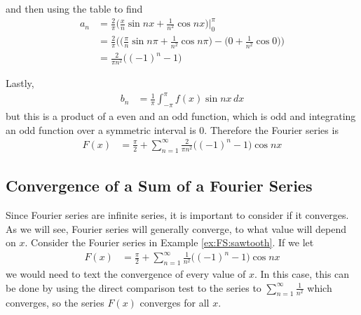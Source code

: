 \begin{example}
\begin{center}
\end{center}
and then using the table to find
%
\begin{align*}
a_n & =\frac{2}{\pi} \biggl( \frac{x}{n} \sin nx + \frac{1}{n^2} \cos nx \biggr) \biggr \vert_0^{\pi} \\
& = \frac{2}{\pi}\biggl(\biggl(\frac{\pi}{n} \sin n \pi + \frac{1}{n^2} \cos n\pi \biggr) - 
\biggl( 0 +\frac{1}{n^2} \cos 0 \biggr) \biggr)\\
& = \frac{2}{\pi n^2} \bigl( (-1)^n - 1) 
\end{align*}

Lastly, 
%
\begin{align*}
b_n & = \frac{1}{\pi} \int_{-\pi}^{\pi} f(x) \sin nx \, dx 
\end{align*}
but this is a product of a even and an odd function, which is odd and integrating an odd function over a symmetric interval is 0.  Therefore the Fourier series is
%
\begin{align*}
F(x) & = \frac{\pi}{2} + \sum_{n=1}^{\infty} \frac{2}{\pi n^2} \bigl( (-1)^n - 1) \cos nx 
\end{align*}

\end{example}


\subsection{Convergence of a Sum of a Fourier Series} 

Since Fourier series are infinite series, it is important to consider if it converges.  As we will see, Fourier series will generally converge, to what value will depend on $x$.   Consider the Fourier series in Example \ref{ex:FS:sawtooth}.  If we let
%
\begin{align*}
F(x) & = \frac{\pi}{2} + \sum_{n=1}^{\infty} \frac{1}{n^2} \bigl( (-1)^n - 1) \cos nx
\end{align*}
we would need to text the convergence of every value of $x$.  In this case, this can be done by using the direct comparison test to the series to $\sum_{n=1}^{\infty} \frac{1}{n^2}$ which converges, so the series $F(x)$ converges for all $x$.  

